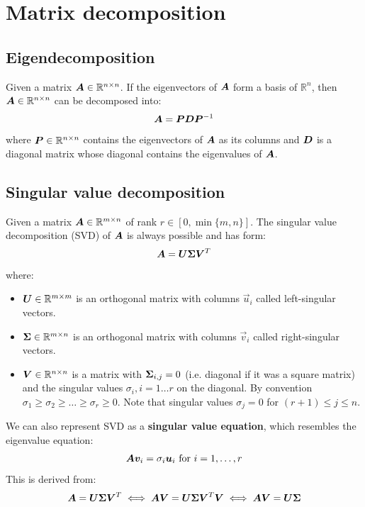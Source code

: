 \chapter{Matrix decomposition}


\section{Eigendecomposition}
Given a matrix ${\bm{A}} \in \mathbb{R}^{n \times n}$.
If the eigenvectors of ${\bm{A}}$ form a basis of $\mathbb{R}^n$,
then ${\bm{A}} \in \mathbb{R}^{n \times n}$ can be decomposed into:
\[ {\bm{A}} = {\bm{P}}{\bm{D}}{\bm{P}}^{-1} \]
where ${\bm{P}} \in \mathbb{R}^{n \times n}$ contains the eigenvectors of ${\bm{A}}$ as its columns and 
${\bm{D}}$ is a diagonal matrix whose diagonal contains the eigenvalues of ${\bm{A}}$.



\section{Singular value decomposition}
Given a matrix ${\bm{A}} \in \mathbb{R}^{m \times n}$ of rank $r \in [0, \min\{m, n\}]$.
The singular value decomposition (SVD) of ${\bm{A}}$ is always possible and has form:
\[
    {\bm{A}} = {\bm{U}}{\bm{\Sigma}}{\bm{V}}^T
\]
where:
\begin{itemize}
    \item 
        ${\bm{U}} \in \mathbb{R}^{m \times m}$ is an orthogonal matrix with columns $\vec{u}_i$ called left-singular vectors.
    
    \item 
        ${\bm{\Sigma}} \in \mathbb{R}^{m \times n}$ is an orthogonal matrix with columns $\vec{v}_i$ called right-singular vectors.
    
    \item 
        ${\bm{V}} \in \mathbb{R}^{n \times n}$ is a matrix with ${\bm{\Sigma}}_{i,j} = 0$ (i.e. diagonal if it was a square matrix) and
        the singular values $\sigma_i, i = 1 \dots r$ on the diagonal.
        By convention $\sigma_1 \geq \sigma_2 \geq \dots \geq \sigma_r \geq 0$.
        Note that singular values $\sigma_j = 0$ for $(r + 1) \leq j \leq n$.
\end{itemize}

We can also represent SVD as a \textbf{singular value equation}, which resembles the eigenvalue equation:
\[  {\bm{A}}{\bm{v}}_i = \sigma_i{\bm{u}}_i \text{ for } i = 1, \dots, r \]
This is derived from:
\[ 
    {\bm{A}} = {\bm{U}}{\bm{\Sigma}}{\bm{V}}^T 
        \iff {\bm{A}}{\bm{V}} = {\bm{U}}{\bm{\Sigma}}{\bm{V}}^T{\bm{V}} 
        \iff {\bm{A}}{\bm{V}} = {\bm{U}}{\bm{\Sigma}}
\]


